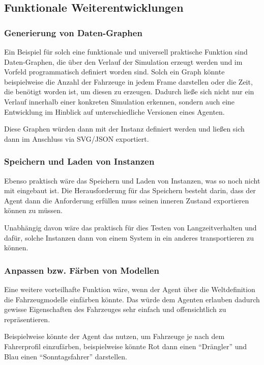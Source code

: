 \subsection{Funktionale Weiterentwicklungen}

\subsubsection{Generierung von Daten-Graphen}

Ein Beispiel für solch eine funktionale und universell praktische Funktion sind Daten-Graphen, die über den Verlauf der Simulation erzeugt werden und im Vorfeld programmatisch definiert worden sind.
Solch ein Graph könnte beispielweise die Anzahl der Fahrzeuge in jedem Frame darstellen oder die Zeit, die benötigt worden ist, um diesen zu erzeugen.
Dadurch ließe sich nicht nur ein Verlauf innerhalb einer konkreten Simulation erkennen, sondern auch eine Entwicklung im Hinblick auf unterschiedliche Versionen eines Agenten.

Diese Graphen würden dann mit der Instanz definiert werden und ließen sich dann im Anschluss via SVG/JSON exportiert.

\subsubsection{Speichern und Laden von Instanzen}

Ebenso praktisch wäre das Speichern und Laden von Instanzen, was so noch nicht mit eingebaut ist.
Die Herausforderung für das Speichern besteht darin, dass der Agent dann die Anforderung erfüllen muss seinen inneren Zustand exportieren können zu müssen.

Unabhängig davon wäre das praktisch für dies Testen von Langzeitverhalten und dafür, solche Instanzen dann von einem System in ein anderes transportieren zu können.

\subsubsection{Anpassen bzw. Färben von Modellen}

Eine weitere vorteilhafte Funktion wäre, wenn der Agent über die Weltdefinition die Fahrzeugmodelle einfärben könnte.
Das würde dem Agenten erlauben dadurch gewisse Eigenschaften des Fahrzeuges sehr einfach und offensichtlich zu repräsentieren.

Beispielweise könnte der Agent das nutzen, um Fahrzeuge je nach dem Fahrerprofil einzufärben, beispielweise könnte Rot dann einen \enquote{Drängler} und Blau einen \enquote{Sonntagsfahrer} darstellen.

